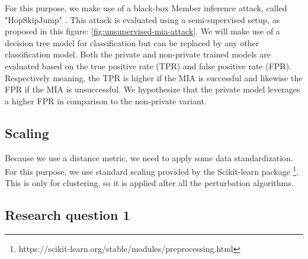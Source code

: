 For this purpose, we make use of a black-box Member inference attack, called "HopSkipJump" \citep{chen_hopskipjumpattack_2020,li_membership_2021}.
This attack is evaluated using a semi-supervised setup, as proposed in this figure: \ref{fig:unsupervised-mia-attack}.
We will make use of a decision tree model for classification but can be replaced by any other classification model.
Both the private and non-private trained models are evaluated based on the true positive rate (TPR) and false positive rate (FPR).
Respectively meaning, the TPR is higher if the MIA is successful and likewise the FPR if the MIA is unsuccessful.
We hypothesize that the private model leverages a higher FPR in comparison to the non-private variant.


\subsection{Scaling}
Because we use a distance metric, we need to apply some data standardization.
For this purpose, we use standard scaling provided by the Scikit-learn package \footnote{https://scikit-learn.org/stable/modules/preprocessing.html}.
This is only for clustering, so it is applied after all the perturbation algorithms.
\subsection{Research question 1}


